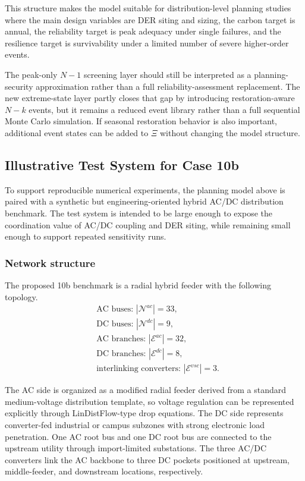 This structure makes the model suitable for distribution-level planning studies where the main design variables are DER siting and sizing, the carbon target is annual, the reliability target is peak adequacy under single failures, and the resilience target is survivability under a limited number of severe higher-order events.

\begin{remark}
The peak-only \(N{-}1\) screening layer should still be interpreted as a planning-security approximation rather than a full reliability-assessment replacement. The new extreme-state layer partly closes that gap by introducing restoration-aware \(N{-}k\) events, but it remains a reduced event library rather than a full sequential Monte Carlo simulation. If seasonal restoration behavior is also important, additional event states can be added to \(\Xi\) without changing the model structure.
\end{remark}

\subsection{Illustrative Test System for Case 10b}

To support reproducible numerical experiments, the planning model above is paired with a synthetic but engineering-oriented hybrid AC/DC distribution benchmark. The test system is intended to be large enough to expose the coordination value of AC/DC coupling and DER siting, while remaining small enough to support repeated sensitivity runs.

\subsubsection{Network structure}

The proposed 10b benchmark is a radial hybrid feeder with the following topology.
\begin{align}
&\text{AC buses: } |
\mathcal{N}^{ac}| = 33, \\
&\text{DC buses: } |\mathcal{N}^{dc}| = 9, \\
&\text{AC branches: } |\mathcal{E}^{ac}| = 32, \\
&\text{DC branches: } |\mathcal{E}^{dc}| = 8, \\
&\text{interlinking converters: } |\mathcal{E}^{vsc}| = 3.
\end{align}

The AC side is organized as a modified radial feeder derived from a standard medium-voltage distribution template, so voltage regulation can be represented explicitly through LinDistFlow-type drop equations. The DC side represents converter-fed industrial or campus subzones with strong electronic load penetration. One AC root bus and one DC root bus are connected to the upstream utility through import-limited substations. The three AC/DC converters link the AC backbone to three DC pockets positioned at upstream, middle-feeder, and downstream locations, respectively.

